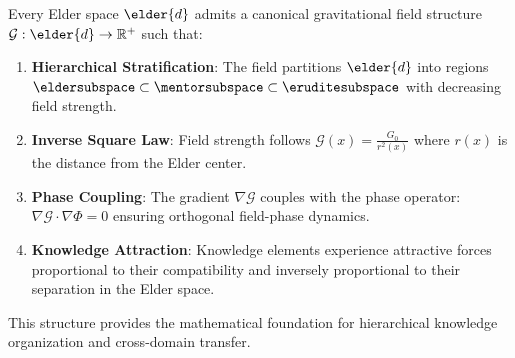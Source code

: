 \begin{theorem}
\label{thm:gravitational_field_structure}
Every Elder space $\elder{d}$ admits a canonical gravitational field structure $\mathcal{G}: \elder{d} \rightarrow \mathbb{R}^+$ such that:
\begin{enumerate}
    \item \textbf{Hierarchical Stratification}: The field partitions $\elder{d}$ into regions $\eldersubspace \subset \mentorsubspace \subset \eruditesubspace$ with decreasing field strength.
    
    \item \textbf{Inverse Square Law}: Field strength follows $\mathcal{G}(x) = \frac{G_0}{r^2(x)}$ where $r(x)$ is the distance from the Elder center.
    
    \item \textbf{Phase Coupling}: The gradient $\nabla \mathcal{G}$ couples with the phase operator: $\nabla \mathcal{G} \cdot \nabla \Phi = 0$ ensuring orthogonal field-phase dynamics.
    
    \item \textbf{Knowledge Attraction}: Knowledge elements experience attractive forces proportional to their compatibility and inversely proportional to their separation in the Elder space.
\end{enumerate}
This structure provides the mathematical foundation for hierarchical knowledge organization and cross-domain transfer.
\end{theorem}

